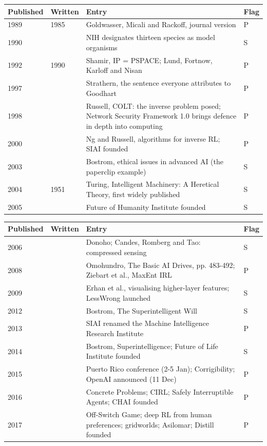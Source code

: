\par\medskip
\noindent
\begin{tabularx}{\textwidth}{XlXl}
\toprule
Published & Written & Entry & Flag \\
\midrule
1989 & 1985 & Goldwasser, Micali and Rackoff, journal version & P \\
1990 &  & NIH designates thirteen species as model organisms & S \\
1992 & 1990 & Shamir, IP = PSPACE; Lund, Fortnow, Karloff and Nisan & P \\
1997 &  & Strathern, the sentence everyone attributes to Goodhart & P \\
1998 &  & Russell, COLT: the inverse problem posed; Network Security Framework 1.0 brings defence in depth into computing & P \\
2000 &  & Ng and Russell, algorithms for inverse RL; SIAI founded & P \\
2003 &  & Bostrom, ethical issues in advanced AI (the paperclip example) & S \\
2004 & 1951 & Turing, Intelligent Machinery: A Heretical Theory, first widely published & S \\
2005 &  & Future of Humanity Institute founded & S \\
\bottomrule
\end{tabularx}
\par\medskip
\noindent
\begin{tabularx}{\textwidth}{XlXl}
\toprule
Published & Written & Entry & Flag \\
\midrule
2006 &  & Donoho; Candes, Romberg and Tao: compressed sensing & S \\
2008 &  & Omohundro, The Basic AI Drives, pp. 483-492; Ziebart et al., MaxEnt IRL & P \\
2009 &  & Erhan et al., visualising higher-layer features; LessWrong launched & S \\
2012 &  & Bostrom, The Superintelligent Will & S \\
2013 &  & SIAI renamed the Machine Intelligence Research Institute & P \\
2014 &  & Bostrom, Superintelligence; Future of Life Institute founded & S \\
2015 &  & Puerto Rico conference (2-5 Jan); Corrigibility; OpenAI announced (11 Dec) & P \\
2016 &  & Concrete Problems; CIRL; Safely Interruptible Agents; CHAI founded & P \\
2017 &  & Off-Switch Game; deep RL from human preferences; gridworlds; Asilomar; Distill founded & P \\
\bottomrule
\end{tabularx}
